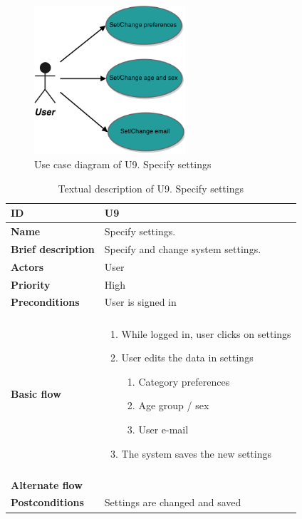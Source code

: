 \begin{figure}[hp]
	\includegraphics[width=0.5\textwidth]{fig/U9}
	\centering
	\caption{Use case diagram of U9. Specify settings}
	\label{Fig:U9}
\end{figure}

\begin{table}[hp]
	\renewcommand{\arraystretch}{1.5}
	\centering
	\caption{Textual description of U9. Specify settings}
	\begin{tabular}[b]{|l | l|}\hline
		\textbf{ID} 				& U9									\\\hline
		\textbf{Name} 				& Specify settings.						\\\hline
		\textbf{Brief description}	& Specify and change system settings. 	\\\hline
		\textbf{Actors} 			& User									\\\hline
		\textbf{Priority}			& High									\\\hline
		\textbf{Preconditions}		& User is signed in						\\\hline&\\[-2ex]
		\textbf{Basic flow}			& \begin{minipage}{5in}
			\begin{enumerate}[noitemsep]
				\item While logged in, user clicks on settings
				\item User edits the data in settings
					\begin{enumerate}
						\item Category preferences
						\item Age group / sex
						\item User e-mail
					\end{enumerate}
				\item The system saves the new settings
			\end{enumerate}						
		\end{minipage}						\\\hline&\\[-2ex]
		\textbf{Alternate flow}		& \begin{minipage}{5in}
		\end{minipage}							\\\hline
		\textbf{Postconditions}		& Settings are changed and saved\\\hline
	\end{tabular}
	\label{Tab:U9}
\end{table}

